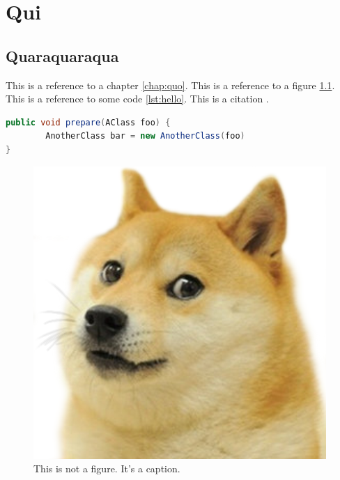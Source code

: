 \chapter{Qui}
\label{chap:qui}

\section{Quaraquaraqua}
\label{sec:quaqaraqua}

This is a reference to a chapter \ref{chap:quo}. This is a reference to a figure \ref{fig:doge}. This is a reference to some code \ref{lst:hello}. This is a citation \cite{famous:paper}.



\begin{lstlisting}[language=Java, label=lst:java, caption={Some code in another language than the default one}]
public void prepare(AClass foo) {
        AnotherClass bar = new AnotherClass(foo)
}
\end{lstlisting}

\foreignlanguage{english}{\Blindtext}

\begin{figure}
\begin{center}
\includegraphics[width=0.5\columnwidth]{images/doge.png}
\end{center}
\caption{This is not a figure. It's a caption.}
\label{fig:doge}
\end{figure}
